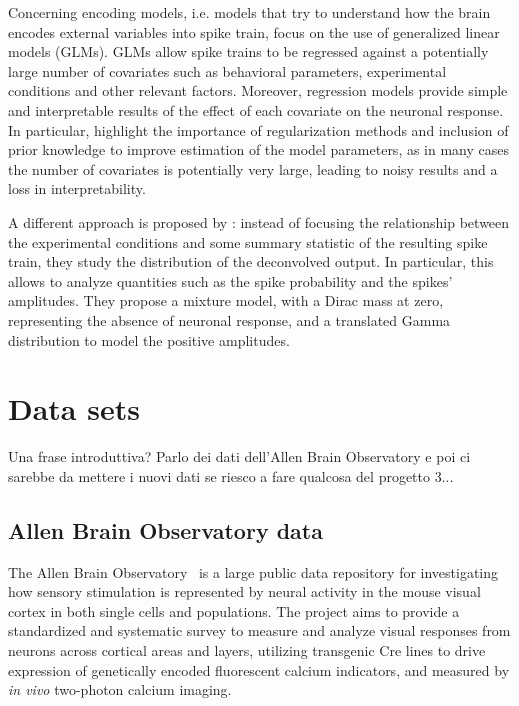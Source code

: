 Concerning encoding models, i.e. models that try to understand how the brain encodes external variables into spike train, \citet{paninski2007} focus on the use of generalized linear models (GLMs). GLMs allow spike trains to be regressed against a potentially large number of covariates such as behavioral parameters, experimental conditions and other relevant factors.
Moreover, regression models provide simple and interpretable results of the effect of each covariate on the neuronal response.
In particular, \citet{paninski2007} highlight the importance of regularization methods and inclusion of prior knowledge to improve estimation of the model parameters, as in many cases the number of covariates is potentially very large, leading to noisy results and a loss in interpretability.

A different approach is proposed by \citet{wei2019}: instead of focusing the relationship between the experimental conditions and some summary statistic of the resulting spike train, they study the distribution of the deconvolved output. In particular, this allows to analyze quantities such as the spike probability and the spikes' amplitudes. They propose a mixture model, with a Dirac mass at zero, representing the absence of neuronal response, and a translated Gamma distribution to model the positive amplitudes.

\section{Data sets} 
Una frase introduttiva? Parlo dei dati dell'Allen Brain Observatory e poi ci sarebbe da mettere i nuovi dati se riesco a fare qualcosa del progetto 3...

\subsection{Allen Brain Observatory data}
The Allen Brain Observatory~\citep{allen} is a large public data repository for investigating how sensory stimulation is represented by neural activity in the mouse visual cortex in both single cells and populations.
The project aims to provide a standardized and systematic survey to measure and analyze visual responses from neurons across cortical areas and layers, utilizing transgenic Cre lines to drive expression of genetically encoded fluorescent calcium indicators, and measured by \textit{in vivo} two-photon calcium imaging.

